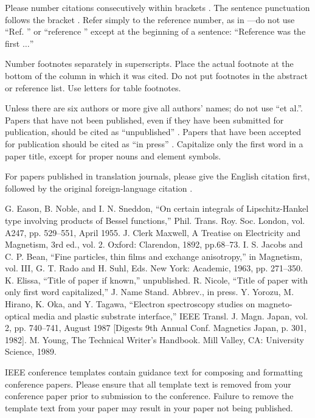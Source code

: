 \documentclass[conference]{IEEEtran}
\begin{document}
Please number citations consecutively within brackets \cite{b1}. The 
sentence punctuation follows the bracket \cite{b2}. Refer simply to the reference 
number, as in \cite{b3}---do not use ``Ref. \cite{b3}'' or ``reference \cite{b3}'' except at 
the beginning of a sentence: ``Reference \cite{b3} was the first $\ldots$''

Number footnotes separately in superscripts. Place the actual footnote at 
the bottom of the column in which it was cited. Do not put footnotes in the 
abstract or reference list. Use letters for table footnotes.

Unless there are six authors or more give all authors' names; do not use 
``et al.''. Papers that have not been published, even if they have been 
submitted for publication, should be cited as ``unpublished'' \cite{b4}. Papers 
that have been accepted for publication should be cited as ``in press'' \cite{b5}. 
Capitalize only the first word in a paper title, except for proper nouns and 
element symbols.

For papers published in translation journals, please give the English 
citation first, followed by the original foreign-language citation \cite{b6}.

\begin{thebibliography}{00}
 G. Eason, B. Noble, and I. N. Sneddon, ``On certain integrals of Lipschitz-Hankel type involving products of Bessel functions,'' Phil. Trans. Roy. Soc. London, vol. A247, pp. 529--551, April 1955.
 J. Clerk Maxwell, A Treatise on Electricity and Magnetism, 3rd ed., vol. 2. Oxford: Clarendon, 1892, pp.68--73.
 I. S. Jacobs and C. P. Bean, ``Fine particles, thin films and exchange anisotropy,'' in Magnetism, vol. III, G. T. Rado and H. Suhl, Eds. New York: Academic, 1963, pp. 271--350.
 K. Elissa, ``Title of paper if known,'' unpublished.
 R. Nicole, ``Title of paper with only first word capitalized,'' J. Name Stand. Abbrev., in press.
 Y. Yorozu, M. Hirano, K. Oka, and Y. Tagawa, ``Electron spectroscopy studies on magneto-optical media and plastic substrate interface,'' IEEE Transl. J. Magn. Japan, vol. 2, pp. 740--741, August 1987 [Digests 9th Annual Conf. Magnetics Japan, p. 301, 1982].
 M. Young, The Technical Writer's Handbook. Mill Valley, CA: University Science, 1989.
\end{thebibliography}
\vspace{12pt}
\color{red}
IEEE conference templates contain guidance text for composing and formatting conference papers. Please ensure that all template text is removed from your conference paper prior to submission to the conference. Failure to remove the template text from your paper may result in your paper not being published.
\end{document}
